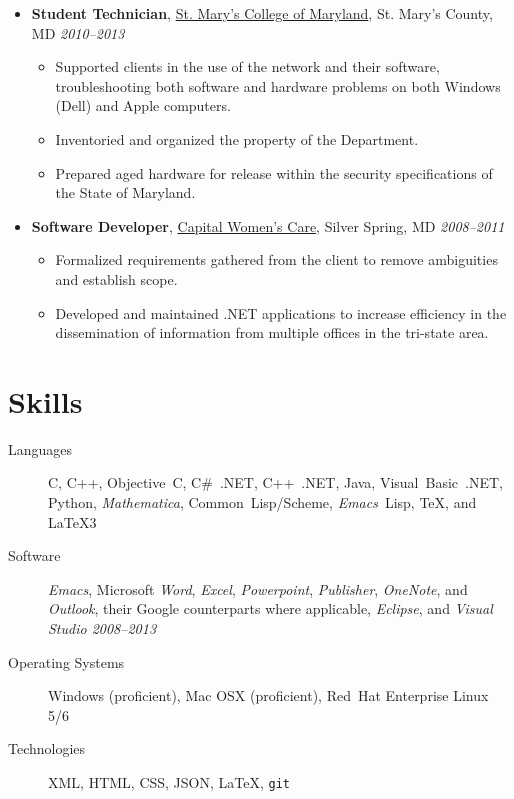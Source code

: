 \documentclass[11pt,a4paper]{article}
\makeatletter
\newcommand{\position}[5]{\item%
  \begin{tabular*}{1.0\linewidth}{l@{\extracolsep{\fill}}r}
    #1 & #2\\
    \textit{#3} & \textit{#4---#5}
  \end{tabular*}}
\renewcommand{\position}[6][]{%
\item[#1] \hspace*{-2em}\textbf{#4}, #2, #3\hfill
  \textit{#5--#6}\vspace*{-.8em}}
\newcommand{\cwc}{\href{http://www.cwcare.net}{Capital Women's Care}}
\newcommand{\software}[1]{\textsl{#1}}
\makeatother
\begin{document}
\begin{itemize}
\position {\href{http://oit.smcm.edu}
                {St. Mary's College of Maryland}}
          {St. Mary's County, MD}
          {Student Technician}
          {2010}{2013}
          \begin{itemize}
          \item Supported clients in the use of the network and their software,
            troubleshooting both software and hardware problems on both Windows (Dell) and Apple computers.
          \item Inventoried and organized the property of the Department.
          \item Prepared aged hardware for release within the security specifications of the State of Maryland.
          \end{itemize}

\position {\cwc}
          {Silver Spring, MD}
          {Software Developer}
          {2008}{2011}
          \begin{itemize}
          \item Formalized requirements gathered from the client to remove ambiguities and establish scope.
          \item Developed and maintained .NET applications to increase efficiency in the dissemination of information from multiple offices in the tri-state area.
          \end{itemize}
\end{itemize}

\section*{Skills}
  \begin{description}
  \item[Languages]
    C,
    C++,
    Objective~C,
    C\#~.NET,
    C++~.NET,
    Java,
    Visual~Basic~.NET,
    Python,
    \software{Mathematica},
    Common~Lisp\slash Scheme,
    \software{Emacs}~Lisp,
    \TeX,
    and \LaTeX3

  \item[Software] \software{Emacs},
    Microsoft \software{Word},
              \software{Excel},
              \software{Powerpoint},
              \software{Publisher},
              \software{OneNote}, and
              \software{Outlook},
    their Google counterparts where applicable,
    \software{Eclipse},
    and \software{Visual Studio 2008--2013}

  \item[Operating Systems] Windows (proficient),
    Mac OSX (proficient),
    Red~Hat Enterprise Linux 5\slash 6

  \item[Technologies] XML,
    HTML,
    CSS,
    JSON,
    \LaTeX{},
    \texttt{git}
  \end{description}
\end{document}
